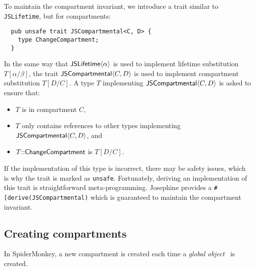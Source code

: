 To maintain the compartment invariant, we introduce
a trait similar to \verb|JSLifetime|, but for compartments:
\begin{verbatim}
  pub unsafe trait JSCompartmental<C, D> {
    type ChangeCompartment;
  }
\end{verbatim}
In the same way that $\mathsf{JSLifetime}\langle \alpha\rangle$ is used to implement
lifetime substitution $T[\alpha/\beta]$, the trait $\mathsf{JSCompartmental}\langle C,D\rangle$
is used to implement compartment substitution $T[D/C]$. A type $T$ implementing
$\mathsf{JSCompartmental}\langle C,D\rangle$ is asked to ensure that:
\begin{itemize}

\item $T$ is in compartment $C$,
\item $T$ only contains references to other types implementing $\mathsf{JSCompartmental}\langle C,D\rangle$, and
\item $T{::}\mathsf{ChangeCompartment}$ is $T[D/C]$.

\end{itemize}
If the implementation of this type is incorrect, there may be safety issues,
which is why the trait is marked as \verb|unsafe|. Fortunately, deriving an
implementation of this trait is straightforward meta-programming.
Josephine provides a \verb|#[derive(JSCompartmental)|
which is guaranteed to maintain
the compartment invariant.

\subsection{Creating compartments}

In SpiderMonkey, a new compartment is created each time a
\emph{global object}~\cite[\S18]{ecmascript} is created.

